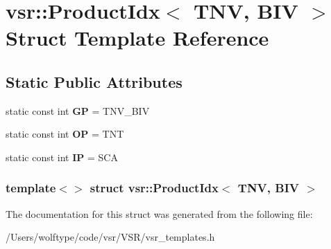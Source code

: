 \hypertarget{structvsr_1_1_product_idx_3_01_t_n_v_00_01_b_i_v_01_4}{\section{vsr\-:\-:Product\-Idx$<$ T\-N\-V, B\-I\-V $>$ Struct Template Reference}
\label{structvsr_1_1_product_idx_3_01_t_n_v_00_01_b_i_v_01_4}
}
\subsection*{Static Public Attributes}
\begin{DoxyCompactItemize}
\item 
\hypertarget{structvsr_1_1_product_idx_3_01_t_n_v_00_01_b_i_v_01_4_a6add11b14b706205a7c56f23bd5ee3c5}{static const int {\bfseries G\-P} = T\-N\-V\-\_\-\-B\-I\-V}\label{structvsr_1_1_product_idx_3_01_t_n_v_00_01_b_i_v_01_4_a6add11b14b706205a7c56f23bd5ee3c5}

\item 
\hypertarget{structvsr_1_1_product_idx_3_01_t_n_v_00_01_b_i_v_01_4_a63f0ff650ce1d8b0159092894f1810ba}{static const int {\bfseries O\-P} = T\-N\-T}\label{structvsr_1_1_product_idx_3_01_t_n_v_00_01_b_i_v_01_4_a63f0ff650ce1d8b0159092894f1810ba}

\item 
\hypertarget{structvsr_1_1_product_idx_3_01_t_n_v_00_01_b_i_v_01_4_afca070abd3cb6ae0262108d644fbd7ec}{static const int {\bfseries I\-P} = S\-C\-A}\label{structvsr_1_1_product_idx_3_01_t_n_v_00_01_b_i_v_01_4_afca070abd3cb6ae0262108d644fbd7ec}

\end{DoxyCompactItemize}
\subsubsection*{template$<$$>$ struct vsr\-::\-Product\-Idx$<$ T\-N\-V, B\-I\-V $>$}



The documentation for this struct was generated from the following file\-:\begin{DoxyCompactItemize}
\item 
/\-Users/wolftype/code/vsr/\-V\-S\-R/vsr\-\_\-templates.\-h\end{DoxyCompactItemize}
